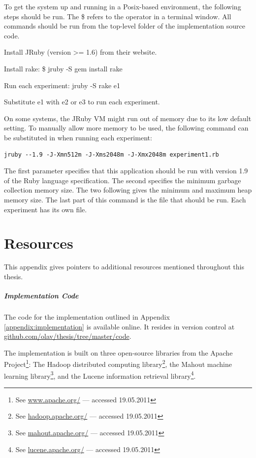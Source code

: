 To get the system up and running in a Posix-based environment, 
the following steps should be run.
The \textsf{\$} refers to the operator in a terminal window.
All commands should be run from the top-level folder of the implementation source code.

\begin{enumerate*}
  \item Install JRuby (version >= 1.6) from their website.
  \item Install rake: \textsf{\$ jruby -S gem install rake}
  \item Run each experiment: \textsf{jruby -S rake e1}
  \item Substitute \textsf{e1} with \textsf{e2} or \textsf{e3} to run each experiment.
\end{enumerate*}

On some systems, the JRuby VM might run out of memory due to its low default setting.
To manually allow more memory to be used, the following command
can be substituted in when running each experiment:

{
\footnotesize
\begin{verbatim}
jruby --1.9 -J-Xmn512m -J-Xms2048m -J-Xmx2048m experiment1.rb
\end{verbatim}
}

The first parameter specifies that this application should be run with version 1.9 of the Ruby language specification.
The second specifies the minimum garbage collection memory size.
The two following gives the minimum and maximum heap memory size.
The last part of this command is the file that should be run.
Each experiment has its own file.


\chapter{Resources}
\label{appendix:resources}

This appendix gives pointers to additional resources mentioned throughout this thesis.

\paragraph{Implementation Code}
The code for the implementation outlined in Appendix \ref{appendix:implementation} is available online.
It resides in version control at 
\url{github.com/olav/thesis/tree/master/code}.

The implementation is built on three open-source libraries from the
Apache Project\footnote{See \url{www.apache.org/} --- accessed 19.05.2011}:
The Hadoop distributed computing library\footnote{See \url{hadoop.apache.org/} --- accessed 19.05.2011},
the Mahout machine learning library\footnote{See \url{mahout.apache.org/} --- accessed 19.05.2011},
and the Lucene information retrieval library\footnote{See \url{lucene.apache.org/} --- accessed 19.05.2011}.


